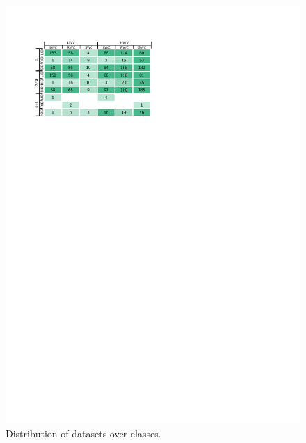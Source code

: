 \begin{figure}[t]
    \centering
    \includegraphics[width=.7\textwidth]{figures/treemap-evaluation/count}
    \caption{Distribution of datasets over classes.}
    \label{fig:datasets_summary}
\end{figure}

